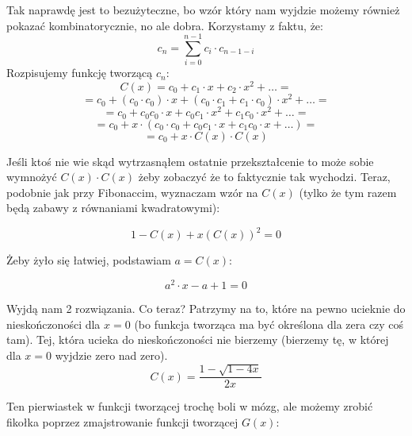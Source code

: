 Tak naprawdę jest to bezużyteczne, bo wzór który nam wyjdzie możemy również pokazać kombinatorycznie, no ale dobra. Korzystamy z faktu, że:
\begin{equation*}
	c_n = \sum_{i = 0}^{n-1} c_i \cdot c_{n-1 - i}
\end{equation*}
Rozpisujemy funkcję tworzącą $c_n$:
\begin{equation*}
	C(x) = c_0 + c_1 \cdot x + c_2 \cdot x^2 + \dots =
\end{equation*}
\begin{equation*}
	= c_0 + (c_0 \cdot c_0) \cdot x + (c_0 \cdot c_1 + c_1 \cdot c_0) \cdot x^2 + \dots =
\end{equation*}
\begin{equation*}
	= c_0 + c_0 c_0\cdot x + c_0c_1 \cdot x^2 + c_1c_0 \cdot x^2 + \dots =
\end{equation*}
\begin{equation*}
	= c_0 + x \cdot (c_0 \cdot c_0 + c_0c_1 \cdot x + c_1c_0 \cdot x + \dots ) =
\end{equation*}
\begin{equation*}
	= c_0 + x \cdot C(x) \cdot C(x)
\end{equation*}

Jeśli ktoś nie wie skąd wytrzasnąłem ostatnie przekształcenie to może sobie wymnożyć $C(x) \cdot C(x)$ żeby zobaczyć że to faktycznie tak wychodzi. Teraz, podobnie jak przy Fibonaccim, wyznaczam wzór na $C(x)$ (tylko że tym razem będą zabawy z równaniami kwadratowymi):

\begin{equation*}
	1 - C(x) + x(C(x))^2 = 0
\end{equation*}

Żeby żyło się łatwiej, podstawiam $a = C(x)$:

\begin{equation*}
	a^2 \cdot x - a + 1 = 0
\end{equation*}

Wyjdą nam 2 rozwiązania. Co teraz? Patrzymy na to, które na pewno ucieknie do nieskończoności dla $x = 0$ (bo funkcja tworząca ma być określona dla zera czy coś tam). Tej, która ucieka do nieskończoności nie bierzemy (bierzemy tę, w której dla $x=0$ wyjdzie zero nad zero).
\begin{equation*}
	C(x) = \frac{1 - \sqrt{1 - 4x}} {2x}
\end{equation*}

Ten pierwiastek w funkcji tworzącej trochę boli w mózg, ale możemy zrobić fikołka poprzez zmajstrowanie funkcji tworzącej $G(x)$:

